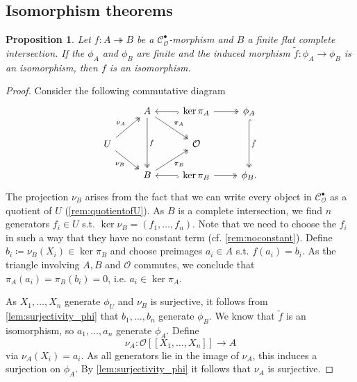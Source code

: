 \documentclass{article}
\theoremstyle{plain}%
\newtheorem{proposition}[theorem]{Proposition}
\theoremstyle{definition}
\theoremstyle{remark}
\newcommand{\cob}{\mathcal{C}_\mathcal{O}^\bullet}
\begin{document}
\subsection{Isomorphism theorems}

\begin{proposition}\textup{\cite[theorem 5.21]{Darmon1995}}\label{prop:phi_iso}
    Let \(f\colon A \twoheadrightarrow B\) be a \(\cob\)-morphism and \(B\) a finite flat complete intersection.
    If the \(\phi_A\) and \(\phi_B\) are finite and 
    the induced morphism \(\tilde f\colon \phi_A \to \phi_B\) is an isomorphism,
    then \(f\) is an isomorphism.
\end{proposition}
\begin{proof}
    Consider the following commutative diagram
    \[
        \begin{tikzcd}
             & A \arrow[dd, "f", two heads] \arrow[rd, "\pi_A", two heads] 
             & \arrow[l, hook]\ker \pi_A \arrow[r, two heads]
             & \phi_A \arrow[dd, hook, two heads, "\tilde f"]\\
            U \arrow[ru, "\nu_A", two heads]\arrow[rd, "\nu_B"', two heads] & & \mathcal{O}&\\
             & B \arrow[ru, "\pi_B"', two heads] & \arrow[l, hook]\ker \pi_B \arrow[r, two heads] & \phi_B.
        \end{tikzcd}
    \]
    The projection \(\nu_B\) arises from the fact that we can write every object in \(\cob\)
    as a quotient of \(U\) (\cref{rem:quotientofU}).
    As \(B\) is a complete intersection, we find \(n\) generators \(f_i \in U\) s.t. \(\ker \nu_B = (f_1, \dots, f_n)\).
    Note that we need to choose the \(f_i\) in such a way that they have no constant term (cf. \cref{rem:noconstant}).
    Define \(b_i \coloneqq \nu_B(X_i) \in \ker \pi_B\) and choose preimages \(a_i \in A\) s.t. \(f(a_i) = b_i\).
    As the triangle involving \(A, B\) and \(\mathcal{O}\) commutes, we conclude that \(\pi_A(a_i) = \pi_B(b_i) = 0\),
    i.e. \(a_i \in \ker \pi_A\).
    
    As \(X_1, \dots, X_n\) generate \(\phi_U\) and \(\nu_B\) is surjective, it follows from \cref{lem:surjectivity_phi}
    that \(b_1, \dots, b_n\) generate \(\phi_B\).
    We know that \(\tilde f\) is an isomorphism, so \(a_1, \dots, a_n\) generate \(\phi_A\).
    Define
    \[
        \nu_A \colon \mathcal{O}[[X_1, \dots, X_n]] \to A
    \] via \(\nu_A(X_i) = a_i\).
    As all generators lie in the image of \(\nu_A\), this induces a surjection on \(\phi_A\).
    By \cref{lem:surjectivity_phi} it follows that \(\nu_A\) is surjective.
    

\end{proof}
\end{document}
